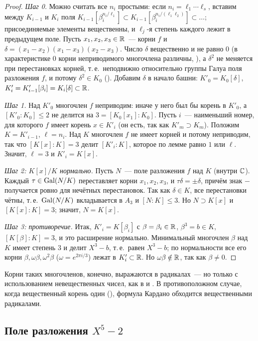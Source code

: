 \begin{proof}
\emph{Шаг 0.} Можно считать все $n_i$ простыми: если $n_i=\ell_1\cdots\ell_s$, вставим между $K_{i-1}$ и $K_i$ поля
$K_{i-1}[\beta_i^{n_i/\ell_1}]\subset K_{i-1}[\beta_i^{n_i/(\ell_1\ell_2)}]\subset\dots$; присоединяемые элементы вещественны, и
$\ell_j$-я степень каждого лежит в предыдущем поле. Пусть $x_1,x_2,x_3\in\mathbb R$~--- корни $f$ и
$\delta=(x_1-x_2)(x_1-x_3)(x_2-x_3)$. Число $\delta$ вещественно и не равно $0$ (в характеристике $0$ корни неприводимого многочлена
различны, ), а $\delta^2$ не меняется при перестановках корней, т.\,е.\ неподвижно относительно группы Галуа
поля разложения $f$, и потому $\delta^2\in K_0$ (). Добавим $\delta$ в начало башни: $K'_0=K_0[\delta]$, $K'_i=K'_{i-1}[\beta_i]=K_i[\delta]\subset\mathbb R$.

\emph{Шаг 1.} Над $K'_0$ многочлен $f$ неприводим: иначе у него был бы корень в $K'_0$, а $[K'_0:K_0]\le2$ не делится на
$3=[K_0[x_1]:K_0]$. Пусть $i$~--- наименьший номер, для которого $f$ имеет корень $x\in K'_i$ (он есть, так как $K'_m\supset K_m$).
Положим $K=K'_{i-1}$, $\ell=n_i$. Над $K$ многочлен $f$ не имеет корней и потому неприводим, так что $[K[x]:K]=3$ делит
$[K'_i:K]$, которое по лемме  равно $1$ или $\ell$. Значит, $\ell=3$ и $K'_i=K[x]$.

\emph{Шаг 2: $K[x]/K$ нормально.} Пусть $N$~--- поле разложения $f$ над $K$ (внутри $\mathbb C$). Каждый $\tau\in\operatorname{Gal}(N/K)$
переставляет корни $x_1,x_2,x_3$, и $\tau\delta=\pm\delta$, причём знак $-$ получается ровно для нечётных перестановок. Так как
$\delta\in K$, все перестановки чётны, т.\,е.\ $\operatorname{Gal}(N/K)$ вкладывается в $A_3$ и $[N:K]\le3$. Но $N\supset K[x]$ и
$[K[x]:K]=3$; значит, $N=K[x]$.

\emph{Шаг 3: противоречие.} Итак, $K'_i=K[\beta_i]$ с $\beta=\beta_i\in\mathbb R$, $\beta^3=b\in K$, $[K[\beta]:K]=3$, и это расширение
нормально. Минимальный многочлен $\beta$ над $K$ имеет степень $3$ и делит $X^3-b$, т.\,е.\ равен $X^3-b$; по нормальности все его
корни $\beta,\omega\beta,\omega^2\beta$ ($\omega=e^{2\pi i/3}$) лежат в $K'_i\subset\mathbb R$. Но $\omega\beta\notin\mathbb R$, так как $\beta\ne0$.
\end{proof}

Корни таких многочленов, конечно, выражаются в радикалах~--- но только с использованием невещественных чисел, как в
 и . В противоположном случае, когда вещественный корень один (), формула Кардано обходится
вещественными радикалами.

\subsection*{Поле разложения $X^5-2$}

